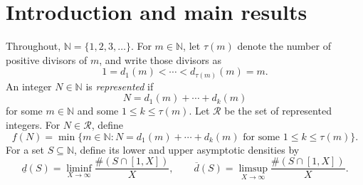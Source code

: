 \documentclass[11pt]{article}
\author{}
\date{}
\theoremstyle{remark}
\newcommand{\N}{\mathbb N}
\newcommand{\Rcal}{\mathcal R}
\newcommand{\1}{\mathbf 1}
\newcommand{\lowerdens}{\underline d}
\newcommand{\upperdens}{\overline d}
\begin{document}
\begin{abstract}
Let $\mathcal R$ be the set of positive integers representable as the sum of an
initial segment of the positive divisors of some integer, and, for
$n\in\mathcal R$, let $f(n)$ be the least such integer.  Erd\H{o}s asked whether
$f(n)=o(n)$, whether this holds for almost all $n$, and whether
$\limsup_{n\to\infty,\ n\in\mathcal R}f(n)/n=\infty$.  We use a
computer-assisted classification showing that
$\mathcal R=\mathbb N\setminus\{2,5\}$ and obtain quantitative estimates for
both tails of $f(n)/n$.

There is an absolute constant $c>0$ such that, uniformly in $X$ and for all
sufficiently small $\delta>0$,
\[
 \#\{n\leq X:n\in\mathcal R,\ f(n)\leq\delta n\}
 \ll \exp\!\left\{-\exp\bigl((1/\delta)^c\bigr)\right\}X.
\]
Conversely, for every fixed $\delta>0$, the inequality $f(n)\leq\delta n$
holds on a set of positive lower density.  At the opposite tail, as
$T\to\infty$,
\[
 \liminf_{X\to\infty}\frac1X
 \#\{n\leq X:n\in\mathcal R,\ f(n)>Tn\}
 \geq\left(\frac{e^{-\gamma}}2-o(1)\right)
 \frac{\log_3T}{(\log T)(\log_2T)}.
\]
Moreover, for every fixed $\eta>0$, at least $c_\eta X/\log_3X$
integers $X/2<n\leq X$ satisfy
\[
 \frac{f(n)}n>
 \exp\!\left[\left(\frac1{\sqrt2}-\eta\right)
 \sqrt{\log_3n\,\log_4n}\right]
\]
for all sufficiently large $X$.  Here $\log_j$ denotes the $j$-fold iterated
natural logarithm.
\end{abstract}


\section{Introduction and main results}\label{sec:introduction}

Throughout, $\N=\{1,2,3,\ldots\}$.  For $m\in\N$, let $\tau(m)$ denote the
number of positive divisors of $m$, and write those divisors as
\[
 1=d_1(m)<\cdots<d_{\tau(m)}(m)=m.
\]
An integer $N\in\N$ is \emph{represented} if
\[
 N=d_1(m)+\cdots+d_k(m)
\]
for some $m\in\N$ and some $1\leq k\leq\tau(m)$.  Let $\Rcal$ be the set
of represented integers.  For $N\in\Rcal$, define
\[
 f(N)=\min\bigl\{m\in\N:N=d_1(m)+\cdots+d_k(m)
       \text{ for some }1\leq k\leq\tau(m)\bigr\}.
\]
For a set $S\subseteq\N$, define its lower and upper asymptotic densities by
\[
 \lowerdens(S)=\liminf_{X\to\infty}\frac{\#(S\cap[1,X])}{X},\qquad
 \upperdens(S)=\limsup_{X\to\infty}\frac{\#(S\cap[1,X])}{X}.
\]
\end{document}
